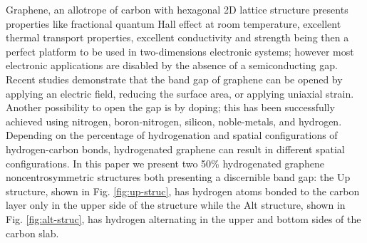\documentclass[floatfix,prb,aps,superscriptaddress,showpacs,11pt,preprint,letterpaper]{revtex4}
\begin{document}
Graphene, an allotrope of carbon with hexagonal 2D lattice structure presents
properties like fractional quantum Hall effect at room temperature, excellent
thermal transport properties, excellent conductivity\cite{heerscheNat07} and
strength \cite{geimNM07, reinaNL08, novoselov2S07, balandinNL08} being then a
perfect platform to be used in two-dimensions electronic systems; however most
electronic applications are disabled by the absence of a semiconducting gap.
Recent studies demonstrate that the band gap of graphene can be opened by
applying an electric field,\cite{zhangN09} reducing the surface
area,\cite{hanPRL07} or applying uniaxial strain.\cite{niACSN08} Another
possibility to open the gap is by doping; this has been successfully achieved
using nitrogen,\cite{weiNL2009} boron-nitrogen,\cite{guoIJ11}
silicon,\cite{colettiPRB10} noble-metals,\cite{varykhalovPRB10} and
hydrogen.\cite{eliasS09, guisingerNL09, samarakoonACSN10}
% 
Depending on the percentage of hydrogenation and spatial configurations of
hydrogen-carbon bonds, hydrogenated graphene can result in different spatial
configurations.
% 
In this paper we present two 50\% hydrogenated graphene noncentrosymmetric
structures both presenting a discernible band gap: the Up structure,
shown in Fig. \ref{fig:up-struc}, has hydrogen atoms bonded to the carbon layer
only in the upper side of the structure while the Alt structure, shown
in Fig. \ref{fig:alt-struc}, has hydrogen alternating in the upper and bottom
sides of the carbon slab.\cite{zapataPSB2016}
\end{document}
